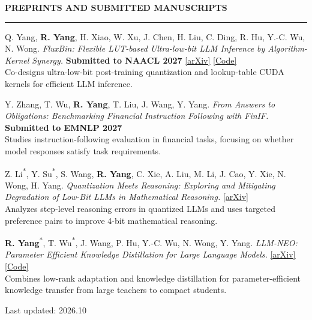 \documentclass[11pt,a4paper]{article}
\newcommand{\submissionbadge}[1]{\begingroup\setlength{\fboxsep}{1.5pt}\colorbox{submissionfill}{\textcolor{venuetext}{\bfseries #1}}\endgroup}
\newenvironment{rSection}[1]{
  \Needspace{7\baselineskip}\medskip
  \textbf{#1}\smallskip\hrule\smallskip
}{\par}
\begin{document}
\begin{rSection}{PREPRINTS AND SUBMITTED MANUSCRIPTS}
\begin{enumerate}[label={[P\arabic*]}]
\item\begin{samepage} Q. Yang, \textbf{R. Yang}, H. Xiao, W. Xu, J. Chen, H. Liu, C. Ding, R. Hu, Y.-C. Wu, N. Wong. \textit{FluxBin: Flexible LUT-based Ultra-low-bit LLM Inference by Algorithm-Kernel Synergy.} \submissionbadge{Submitted to NAACL 2027} \href{https://arxiv.org/abs/2608.15602}{[arXiv]} \href{https://github.com/nicyyyy/FluxBin}{[Code]}\\[1pt]{\textcolor{summarytext}{Co-designs ultra-low-bit post-training quantization and lookup-table CUDA kernels for efficient LLM inference.}}\par\end{samepage}
\item\begin{samepage} Y. Zhang, T. Wu, \textbf{R. Yang}, T. Liu, J. Wang, Y. Yang. \textit{From Answers to Obligations: Benchmarking Financial Instruction Following with FinIF.} \submissionbadge{Submitted to EMNLP 2027} \\[1pt]{\textcolor{summarytext}{Studies instruction-following evaluation in financial tasks, focusing on whether model responses satisfy task requirements.}}\par\end{samepage}
\item\begin{samepage} Z. Li\textsuperscript{*}, Y. Su\textsuperscript{*}, S. Wang, \textbf{R. Yang}, C. Xie, A. Liu, M. Li, J. Cao, Y. Xie, N. Wong, H. Yang. \textit{Quantization Meets Reasoning: Exploring and Mitigating Degradation of Low-Bit LLMs in Mathematical Reasoning.}  \href{https://arxiv.org/abs/2505.11574}{[arXiv]}\\[1pt]{\textcolor{summarytext}{Analyzes step-level reasoning errors in quantized LLMs and uses targeted preference pairs to improve 4-bit mathematical reasoning.}}\par\end{samepage}
\item\begin{samepage} \textbf{R. Yang}\textsuperscript{*}, T. Wu\textsuperscript{*}, J. Wang, P. Hu, Y.-C. Wu, N. Wong, Y. Yang. \textit{LLM-NEO: Parameter Efficient Knowledge Distillation for Large Language Models.}  \href{https://arxiv.org/abs/2411.06839}{[arXiv]} \href{https://github.com/yang3121099/LLM-Neo}{[Code]}\\[1pt]{\textcolor{summarytext}{Combines low-rank adaptation and knowledge distillation for parameter-efficient knowledge transfer from large teachers to compact students.}}\par\end{samepage}
\end{enumerate}\end{rSection}\normalsize
\par\vspace{2pt}{\parfillskip=0pt\noindent\rule{\linewidth}{0.4pt}\par}
\begin{center}\footnotesize Last updated: 2026.10\end{center}
\end{document}
